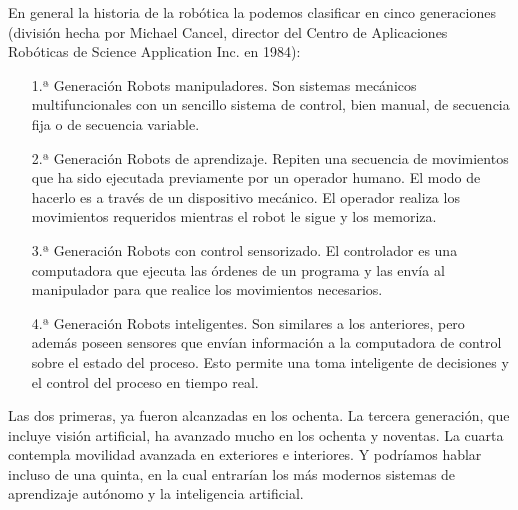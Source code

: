En general la historia de la robótica la podemos clasificar en cinco generaciones (división hecha por Michael Cancel, director del Centro de Aplicaciones Robóticas de Science Application Inc. en 1984): 
\begin{enumerate}[1.ª Generación]
	\item[1.ª Generación] Robots manipuladores. Son sistemas mecánicos multifuncionales con un sencillo sistema de control, bien manual, de secuencia fija o de secuencia variable.
	\item[2.ª Generación] Robots de aprendizaje. Repiten una secuencia de movimientos que ha sido ejecutada previamente por un operador humano. El modo de hacerlo es a través de un dispositivo mecánico. El operador realiza los movimientos requeridos mientras el robot le sigue y los memoriza.
	\item[3.ª Generación] Robots con control sensorizado. El controlador es una computadora que ejecuta las órdenes de un programa y las envía al manipulador para que realice los movimientos necesarios.
	\item[4.ª Generación] Robots inteligentes. Son similares a los anteriores, pero además poseen sensores que envían información a la computadora de control sobre el estado del proceso. Esto permite una toma inteligente de decisiones y el control del proceso en tiempo real.
\end{enumerate}

Las dos primeras, ya fueron alcanzadas en los ochenta. La tercera generación, que incluye visión artificial, ha avanzado mucho en los ochenta y noventas. La cuarta contempla movilidad avanzada en exteriores e interiores. Y podríamos hablar incluso de una quinta, en la cual entrarían los más modernos sistemas de aprendizaje autónomo y la inteligencia artificial.

